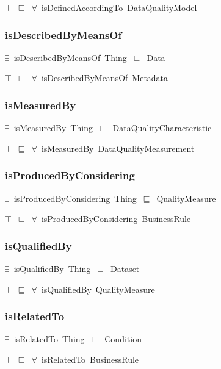 \documentclass{article}
\begin{document}
\ensuremath{\top}~\ensuremath{\sqsubseteq}~\ensuremath{\forall}~isDefinedAccordingTo~DataQualityModel

\subsubsection*{isDescribedByMeansOf}

\ensuremath{\exists}~isDescribedByMeansOf~Thing~\ensuremath{\sqsubseteq}~Data

\ensuremath{\top}~\ensuremath{\sqsubseteq}~\ensuremath{\forall}~isDescribedByMeansOf~Metadata

\subsubsection*{isMeasuredBy}

\ensuremath{\exists}~isMeasuredBy~Thing~\ensuremath{\sqsubseteq}~DataQualityCharacteristic

\ensuremath{\top}~\ensuremath{\sqsubseteq}~\ensuremath{\forall}~isMeasuredBy~DataQualityMeasurement

\subsubsection*{isProducedByConsidering}

\ensuremath{\exists}~isProducedByConsidering~Thing~\ensuremath{\sqsubseteq}~QualityMeasure

\ensuremath{\top}~\ensuremath{\sqsubseteq}~\ensuremath{\forall}~isProducedByConsidering~BusinessRule

\subsubsection*{isQualifiedBy}

\ensuremath{\exists}~isQualifiedBy~Thing~\ensuremath{\sqsubseteq}~Dataset

\ensuremath{\top}~\ensuremath{\sqsubseteq}~\ensuremath{\forall}~isQualifiedBy~QualityMeasure

\subsubsection*{isRelatedTo}

\ensuremath{\exists}~isRelatedTo~Thing~\ensuremath{\sqsubseteq}~Condition

\ensuremath{\top}~\ensuremath{\sqsubseteq}~\ensuremath{\forall}~isRelatedTo~BusinessRule
\end{document}

